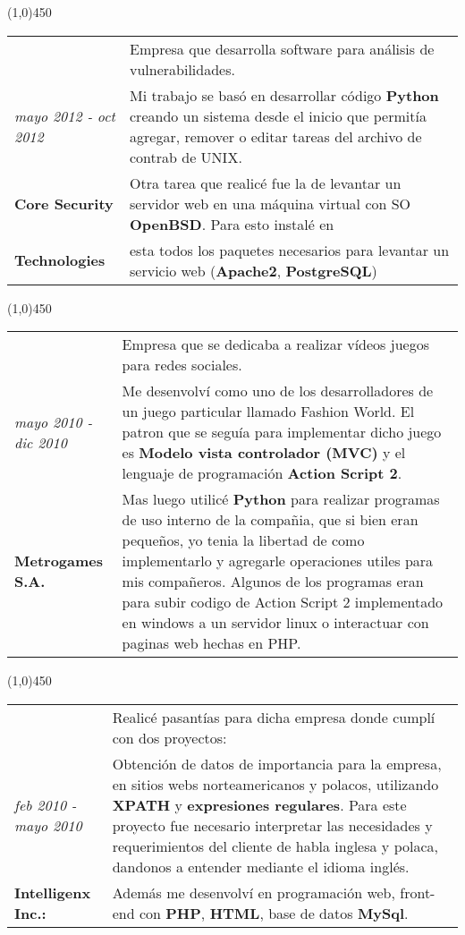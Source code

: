 \begin{center}
\line(1,0){450}
\end{center}
\begin{tabular}{C{5cm}|p{11cm}}
& \large Empresa que desarrolla software para análisis de vulnerabilidades.\\
\large\textit{mayo 2012 - oct 2012} &  \large Mi trabajo se basó en desarrollar código \textbf{Python} creando un sistema desde el inicio que permitía agregar, remover o editar tareas del archivo de contrab de UNIX. \\
\large\textbf{Core Security} & \large  Otra tarea que realicé fue la de levantar un servidor web en una máquina virtual con SO \textbf{OpenBSD}. Para esto instalé en \\
 \large\textbf{Technologies} & \large esta todos los paquetes necesarios para levantar un servicio web (\textbf{Apache2}, \textbf{PostgreSQL}) \\
\end{tabular}

\begin{center}
\line(1,0){450}
\end{center}
\noindent
\begin{tabular}{C{5cm}|p{11cm}}
& \large Empresa que se dedicaba a realizar vídeos juegos para redes sociales.\\
\large\textit{mayo 2010 - dic 2010} &  \large Me desenvolví como uno de los desarrolladores de un juego particular llamado Fashion World. El patron que se seguía para implementar dicho juego es \textbf{Modelo vista controlador (MVC)} y el lenguaje de programación \textbf{Action Script 2}.\\
\large\textbf{Metrogames S.A.} & \large Mas luego utilicé \textbf{Python} para realizar programas de uso interno de la compañia, que si bien eran pequeños, yo tenia la libertad de como implementarlo y agregarle operaciones utiles para mis compañeros. Algunos de los programas eran para subir codigo de Action Script 2 implementado en windows a un servidor linux o interactuar con paginas web hechas en PHP.
\end{tabular}

\begin{center}
\line(1,0){450}
\end{center}
\noindent
\begin{tabular}{C{5cm}|p{11cm}}
& \large Realicé pasantías para dicha empresa donde cumplí con dos proyectos:\\
\large\textit{feb 2010 - mayo 2010} & \large Obtención de datos de importancia para la empresa, en sitios webs norteamericanos y polacos, utilizando \textbf{XPATH} y \textbf{expresiones regulares}.  Para este proyecto fue necesario interpretar las necesidades y requerimientos del cliente de habla inglesa y polaca, dandonos a entender mediante el idioma inglés.\\
\large\textbf{Intelligenx Inc.:} & \large Además me desenvolví en programación web, front-end con \textbf{PHP}, \textbf{HTML}, base de datos \textbf{MySql}.
\end{tabular}

